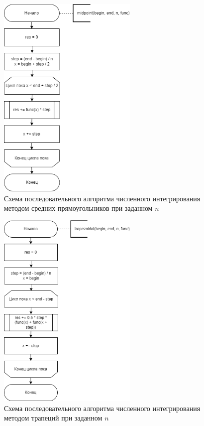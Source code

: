 \begin{figure}[h!btp]
	\centering
	\includegraphics[width=190pt]{inc/int_midpoint.png}
	\caption{Схема последовательного алгоритма численного интегрирования методом средних прямоугольников при заданном $n$}
	\label{fig:diagram-int-midpoint}	
\end{figure}

\begin{figure}[h!btp]
	\centering
	\includegraphics[width=190pt]{inc/int_trapez.png}
	\caption{Схема последовательного алгоритма численного интегрирования методом трапеций при заданном $n$}
	\label{fig:diagram-int-trapez}	
\end{figure}

\clearpage

